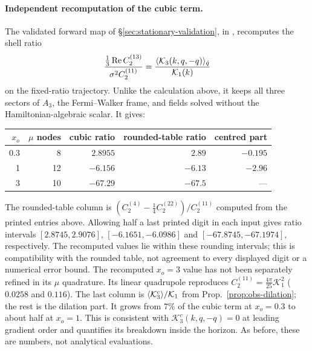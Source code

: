 \paragraph{Independent recomputation of the cubic term.} The validated forward map of
\S\ref{sec:stationary-validation}, in , recomputes the
shell ratio
\[
 \frac{\frac13\operatorname{Re}C^{(13)}_2}{\sigma^2C^{(11)}_2}=\frac{\langle \mathcal K_3(k,q,-q)\rangle_{\hat q}}{\mathcal K_1(k)}
\]
on the fixed-ratio trajectory. Unlike the calculation above, it keeps all three sectors of $A_3$,
the Fermi--Walker frame, and fields solved without the Hamiltonian-algebraic scalar. It gives:
\begin{center}
\begin{tabular}{rrrrr}
\toprule
$x_o$ & $\mu$ nodes & cubic ratio & rounded-table ratio & centred part\\\midrule
0.3 & 8  & $2.8955$  & $2.89$ & $-0.195$\\
1   & 12 & $-6.156$  & $-6.13$ & $-2.96$\\
3   & 10 & $-67.29$  & $-67.5$ & ---\\
\bottomrule
\end{tabular}
\end{center}
The rounded-table column is $(C^{(4)}_2-\frac14C^{(22)}_2)/C^{(11)}_2$ computed from the
printed entries above. Allowing half a last printed digit in each input gives ratio intervals
$[2.8745,2.9076]$, $[-6.1651,-6.0986]$ and $[-67.8745,-67.1974]$, respectively.
The recomputed values lie within these rounding intervals; this is compatibility with the
rounded table, not agreement to every displayed digit or a numerical error bound.
The recomputed $x_o=3$ value has not been separately refined in its $\mu$ quadrature.
Its linear quadrupole reproduces $C^{(11)}_2=\frac{4\pi}{25}\mathcal K_1^2$ ($0.0258$ and $0.116$).
The last column is
$\langle \mathcal K^c_3\rangle/\mathcal K_1$ from Prop.~\ref{prop:obs-dilation}; the rest is the dilation part. It grows
from $7\%$ of the cubic term at $x_o=0.3$ to about half at $x_o=1$. This is consistent with
$\mathcal K^c_3(k,q,-q)=0$ at leading gradient order and quantifies its breakdown inside the
horizon. As before, these are numbers, not analytical evaluations.

